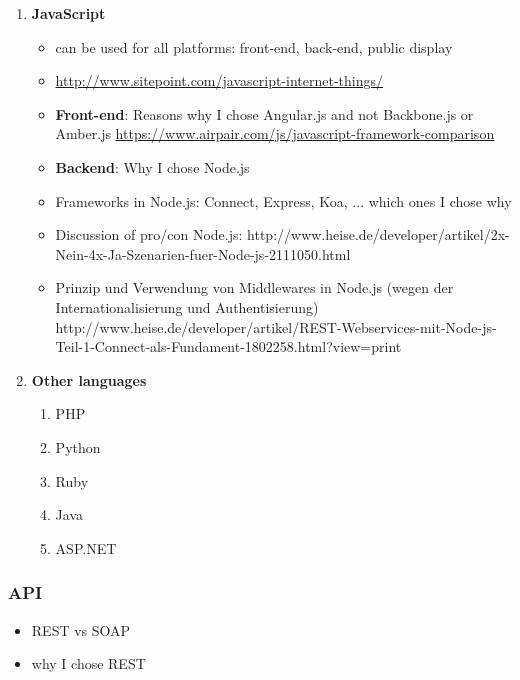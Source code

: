 \begin{enumerate}
\item \textbf{JavaScript}

    \begin{itemize}
        \item can be used for all platforms: front-end, back-end, public display
        \item \url{http://www.sitepoint.com/javascript-internet-things/}
        \item \textbf{Front-end}: Reasons why I chose Angular.js and not Backbone.js or Amber.js \url{https://www.airpair.com/js/javascript-framework-comparison}
        \item \textbf{Backend}: Why I chose Node.js
        \item Frameworks in Node.js: Connect, Express, Koa, ... which ones I chose why
        \item Discussion of pro/con Node.js: http://www.heise.de/developer/artikel/2x-Nein-4x-Ja-Szenarien-fuer-Node-js-2111050.html
        \item Prinzip und Verwendung von Middlewares in Node.js (wegen der Internationalisierung und Authentisierung) http://www.heise.de/developer/artikel/REST-Webservices-mit-Node-js-Teil-1-Connect-als-Fundament-1802258.html?view=print

    \end{itemize}
    
\item \textbf{Other languages}

    \begin{enumerate}
    \item PHP
    \item Python
    \item Ruby
    \item Java
    \item ASP.NET
    \end{enumerate}

\end{enumerate}
    





\subsubsection{API}

\begin{itemize}
\item REST vs SOAP
\item why I chose REST
\end{itemize}

